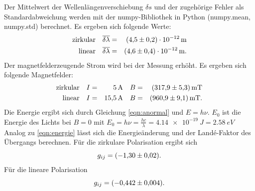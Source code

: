 %
%
Der Mittelwert der Wellenlängenverschiebung $\delta s$ und der zugehörige Fehler als Standardabweichung werden mit der numpy-Bibliothek in Python (numpy.mean, numpy.std) berechnet.
Es ergeben sich folgende Werte:
\begin{align*}
  \text{zirkular}  &&  \overline{\delta \lambda} &=& \SI{4.5 \pm 0.2 e-12}{m} \\
  \text{linear}    &&  \overline{\delta \lambda} &=& \SI{4.6 \pm 0.4 e-12}{m}. \\
\end{align*}
Der magnetfelderzeugende Strom wird bei der Messung erhöht.
Es ergeben sich folgende Magnetfelder:
\begin{align*}
  \text{zirkular}  &&   I &=& \SI{5}{A}     && B &=& \SI{317.9 \pm 5.3}{mT}\\
  \text{linear}    &&   I &=& \SI{15.5}{A}  && B &=& \SI{960.9 \pm 9.1}{mT}.\\
\end{align*}
Die Energie ergibt sich durch Gleichung \eqref{eqn:anormal} und $E= h \nu$.
$E_0$ ist die Energie des Lichts bei $B=0$ mit $E_0=h \nu = \frac{hc}{\lambda}= \SI{4.14e-19}{J}=\SI{2.58}{eV}$
Analog zu \eqref{eqn:energie} lässt sich die Energieänderung und der Landé-Faktor des Übergangs berechnen.
Für die zirkulare Polarisation ergibt sich
\begin{equation*}
  g_{ij} = \SI{-1.30 \pm 0.02}{}.
\end{equation*}
Für die lineare Polarisation
\begin{equation*}
  g_{ij} = \SI{-0.442 \pm 0.004}{}.
\end{equation*}

\FloatBarrier
%
